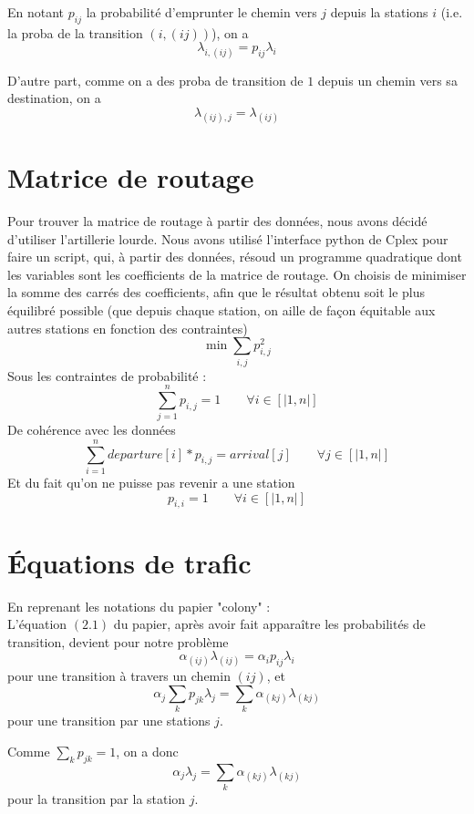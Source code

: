 \documentclass[12pt,a4paper]{article}
\begin{document}
En notant $p_{ij}$ la probabilité d'emprunter le chemin vers $j$ depuis la stations $i$ (i.e. la proba de la transition $\left(i,(ij) \right)$), on a
\[
\lambda_{i,(ij)} = p_{ij} \lambda_i
\]

D'autre part, comme on a des proba de transition de $1$ depuis un chemin vers sa destination, on a
\[
\lambda_{(ij),j} = \lambda_{(ij)}
\]


\section{Matrice de routage}

Pour trouver la matrice de routage à partir des données, nous avons décidé d'utiliser l'artillerie lourde. Nous avons utilisé l'interface python de Cplex pour faire un script, qui, à partir des données, résoud un programme quadratique dont les variables sont les coefficients de la matrice de routage.
On choisis de minimiser la somme des carrés des coefficients, afin que le résultat obtenu soit le plus équilibré possible (que depuis chaque station, on aille de façon équitable aux autres stations en fonction des contraintes)
$$ 
	\min \sum_{i,j} p_{i,j}^2
$$
Sous les contraintes de probabilité :
$$
	\sum_{j=1}^n p_{i,j} = 1 \qquad \forall i \in [|1,n|]
$$
De cohérence avec les données
$$
	\sum_{i=1}^n departure[i]*p_{i,j} = arrival[j] \qquad \forall j \in [|1,n|]
$$
Et du fait qu'on ne puisse pas revenir a une station
$$
	p_{i,i} = 1 \qquad \forall i \in [|1,n|]
$$

\section{\'Equations de trafic}

En reprenant les notations du papier "colony" :\\

L'équation $(2.1)$ du papier, après avoir fait apparaître les probabilités de transition, devient pour notre problème
\begin{equation}
\alpha_{(ij)} \lambda_{(ij)} = \alpha_i p_{ij} \lambda_i
\label{eq:trafic_1}
\end{equation}
pour une transition à travers un chemin $(ij)$, et
\begin{equation}
\alpha_j \sum_k p_{jk} \lambda_j = \sum_k \alpha_{(kj)} \lambda_{(kj)}
\label{eq:trafic_2}
\end{equation}
pour une transition par une stations $j$.

Comme $\sum_k p_{jk} = 1$, on a donc
\begin{equation}
\alpha_j \lambda_j = \sum_k \alpha_{(kj)} \lambda_{(kj)}
\label{eq:trafic_2_bis}
\end{equation}
pour la transition par la station $j$.\\
\end{document}
